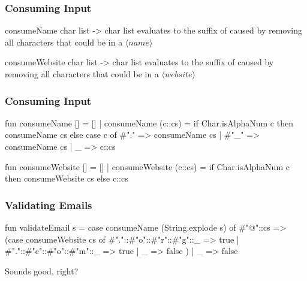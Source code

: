 \documentclass[aspectratio=169]{beamer}
\begin{document}
\begin{frame}[fragile]
  \frametitle{Consuming Input}

  \spec
    {consumeName}
    {char list -> char list}
    {}
    { evaluates to the suffix of  caused by
    removing all characters that could be in a $\langle name\rangle$}

  \vspace{\fill}

  \spec
    {consumeWebsite}
    {char list -> char list}
    {}
    { evaluates to the suffix of  caused by
    removing all characters that could be in a $\langle website\rangle$}
\end{frame}


\begin{frame}[fragile]
  \frametitle{Consuming Input}

  \pause
  \small
  \begin{codeblock}
    fun consumeName [] = []
      | consumeName (c::cs) =
          if Char.isAlphaNum c then
            consumeName cs
          else
            case c of
              #"." => consumeName cs
            | #"_" => consumeName cs
            | _ => c::cs
  \end{codeblock}

  \begin{codeblock}
    fun consumeWebsite [] = []
      | consumeWebsite (c::cs) =
          if Char.isAlphaNum c then
            consumeWebsite cs
          else
            c::cs
  \end{codeblock}
\end{frame}

\begin{frame}[fragile]
  \frametitle{Validating Emails}

  \pause
  \begin{codeblock}
    fun validateEmail s =
      case consumeName (String.explode s) of
        #"@"::cs =>
          (case consumeWebsite cs of
            #"."::#"o"::#"r"::#"g"::_ => true
          | #"."::#"c"::#"o"::#"m"::_ => true
          | _ => false
          )
      | _ => false
  \end{codeblock}

  \pause
  \vspace{\fill}

  Sounds good, right?
\end{frame}
\end{document}
